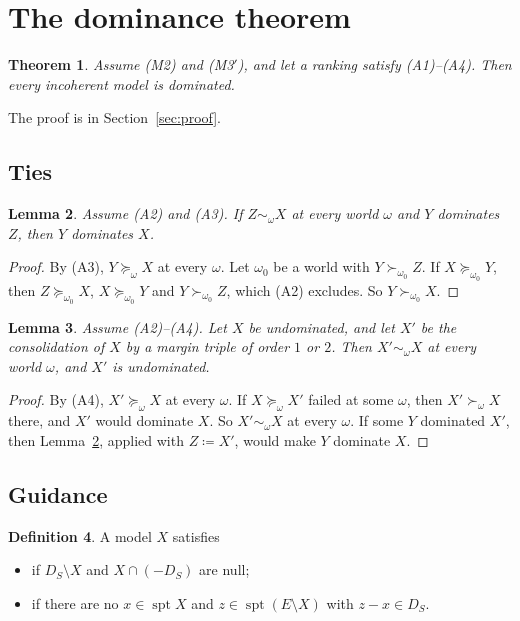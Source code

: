 \documentclass[11pt]{article}
\DeclareMathOperator{\spt}{spt}
\theoremstyle{plain}
\newtheorem{theorem}{Theorem}[section]
\newtheorem{lemma}[theorem]{Lemma}
\theoremstyle{definition}
\newtheorem{definition}[theorem]{Definition}
\theoremstyle{remark}
\begin{document}
\section{The dominance theorem}\label{sec:dominance}

\begin{theorem}\label{thm:dominance}
Assume (M2) and (M3$'$), and let a ranking satisfy (A1)--(A4). Then every incoherent model is
dominated.
\end{theorem}

The proof is in Section~\ref{sec:proof}.

\subsection{Ties}

\begin{lemma}\label{lem:tie}
Assume (A2) and (A3). If $Z\sim_\omega X$ at every world $\omega$ and $Y$ dominates $Z$, then
$Y$ dominates $X$.
\end{lemma}

\begin{proof}
By (A3), $Y\succeq_\omega X$ at every $\omega$. Let $\omega_0$ be a world with
$Y\succ_{\omega_0}Z$. If $X\succeq_{\omega_0}Y$, then $Z\succeq_{\omega_0}X$,
$X\succeq_{\omega_0}Y$ and $Y\succ_{\omega_0}Z$, which (A2) excludes. So $Y\succ_{\omega_0}X$.
\end{proof}

\begin{lemma}\label{lem:constie}
Assume (A2)--(A4). Let $X$ be undominated, and let $X'$ be the consolidation of $X$ by a margin
triple of order $1$ or $2$. Then $X'\sim_\omega X$ at every world $\omega$, and $X'$ is
undominated.
\end{lemma}

\begin{proof}
By (A4), $X'\succeq_\omega X$ at every $\omega$. If $X\succeq_\omega X'$ failed at some
$\omega$, then $X'\succ_\omega X$ there, and $X'$ would dominate $X$. So $X'\sim_\omega X$ at
every $\omega$. If some $Y$ dominated $X'$, then Lemma~\ref{lem:tie}, applied with $Z\coloneqq
X'$, would make $Y$ dominate $X$.
\end{proof}

\subsection{Guidance}

\begin{definition}\label{def:U}
A model $X$ satisfies
\begin{itemize}
  \item[(U1)] if $D_S\setminus X$ and $X\cap(-D_S)$ are null;
  \item[(U2)] if there are no $x\in\spt X$ and $z\in\spt(E\setminus X)$ with $z-x\in D_S$.
\end{itemize}
\end{definition}
\end{document}
